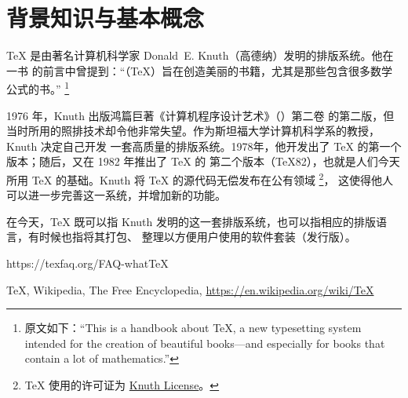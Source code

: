%
%
%
%


\section{背景知识与基本概念}
\label{sec:basic}


\TeX{} 是由著名计算机科学家 Donald~E. Knuth（高德纳）发明的排版系统。他在  一书
的前言中曾提到：“（\TeX{}）旨在创造美丽的书籍，尤其是那些包含很多数学公式的书。”
\footnote{原文如下：“This is a handbook about \TeX{}, a new typesetting system intended for the
creation of beautiful books---and especially for books that contain a lot of mathematics.”}

1976 年，Knuth 出版鸿篇巨著《计算机程序设计艺术》（）第二卷
的第二版，但当时所用的照排技术却令他非常失望。作为斯坦福大学计算机科学系的教授，Knuth 决定自己开发
一套高质量的排版系统。1978年，他开发出了 \TeX{} 的第一个版本；随后，又在 1982 年推出了 \TeX{} 的
第二个版本（\TeX 82），也就是人们今天所用 \TeX{} 的基础。Knuth 将 \TeX{} 的源代码无偿发布在公有领域
\footnote{\TeX{} 使用的许可证为 \href{https://www.ctan.org/license/knuth}{Knuth License}。}，
这使得他人可以进一步完善这一系统，并增加新的功能。

在今天，\TeX{} 既可以指 Knuth 发明的这一套排版系统，也可以指相应的排版语言，有时候也指将其打包、
整理以方便用户使用的软件套装（发行版）。

\begin{reference}
  \item https://texfaq.org/FAQ-whatTeX
  \item \TeX{}, Wikipedia, The Free Encyclopedia, \url{https://en.wikipedia.org/wiki/TeX}
\end{reference}


